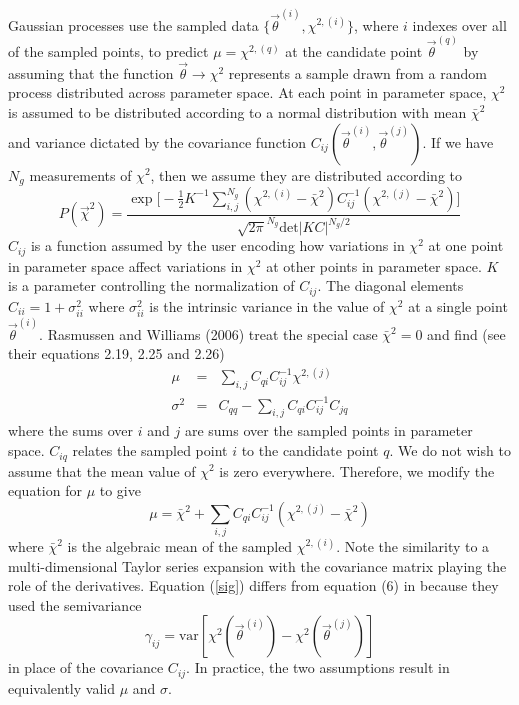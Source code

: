 \documentclass[useAMS,usenatbib]{aastex}
\begin{document}
Gaussian processes use the sampled data $\{\vec{\theta}^{(i)},\chi^{2,(i)}\}$, 
where $i$ indexes over all of the sampled points, to predict
$\mu=\chi^{2,(q)}$ at the candidate point 
$\vec{\theta}^{(q)}$ by assuming that the function
$\vec{\theta}\rightarrow\chi^2$ represents a sample drawn from a random process 
distributed
across parameter space.  At each point in parameter space, 
$\chi^2$ is assumed to be
distributed according to a normal distribution with mean 
$\bar{\chi}^2$
and variance dictated by the covariance function 
$C_{ij}(\vec{\theta}^{(i)},\vec{\theta}^{(j)})$.
If we have $N_g$ measurements of $\chi^2$, then we assume
they are distributed according to
\begin{equation}
\label{eqn:likelihood}
P(\vec{\chi}^2)=
\frac{\exp\bigg[-\frac{1}{2}K^{-1}\sum_{i,j}^{N_g}
(\chi^{2,(i)}-\bar{\chi}^2)C^{-1}_{ij}
(\chi^{2,(j)}-\bar{\chi}^2)\bigg]}{\sqrt{2\pi}^{N_g}\text{det}|KC|^{N_g/2}}
\end{equation}
$C_{ij}$ is a function assumed by the user encoding how variations in
$\chi^2$ at one point in parameter space affect variations in 
$\chi^2$ at other
points in parameter space.  $K$ is a parameter controlling the
normalization of $C_{ij}$.
The diagonal elements $C_{ii}=1+\sigma^2_{ii}$ where 
$\sigma^2_{ii}$ is the intrinsic variance in the value
of $\chi^2$ at a single point $\vec{\theta}^{(i)}$.  
Rasmussen and Williams (2006) treat 
the special case
$\bar{\chi}^2=0$ and find (see their equations 2.19, 2.25 and 2.26)
\begin{eqnarray}
\mu&=&\sum_{i,j} C_{qi}C^{-1}_{ij}\chi^{2,(j)}\nonumber\\
\sigma^2&=&C_{qq}-\sum_{i,j}C_{qi}C^{-1}_{ij}C_{jq}\label{sig}
\end{eqnarray}
where the sums over $i$ and $j$ are sums over the sampled points 
in parameter space.  $C_{iq}$ relates the sampled point $i$ to the candidate
point $q$.
We do not wish to assume that the mean value of $\chi^2$ is zero everywhere.
Therefore, we modify the equation for $\mu$ to give
\begin{equation}
\label{mu}
\mu=\bar{\chi}^2+\sum_{i,j} C_{qi}C^{-1}_{ij}
(\chi^{2,(j)}-\bar{\chi}^2)
\end{equation}
where $\bar{\chi}^2$ is the algebraic mean of the 
sampled $\chi^{2,(i)}$.
Note the similarity to a multi-dimensional Taylor series expansion with the
covariance matrix playing the role of the derivatives.
Equation (\ref{sig}) differs from equation (6) in \cite{bryan} because
they used the semivariance
$$\gamma_{ij}=\text{var}[\chi^2(\vec{\theta}^{(i)})
-\chi^2(\vec{\theta}^{(j)})]$$
in place of the covariance $C_{ij}$.  In practice, the two assumptions result in
equivalently valid $\mu$ and $\sigma$.
\end{document}
